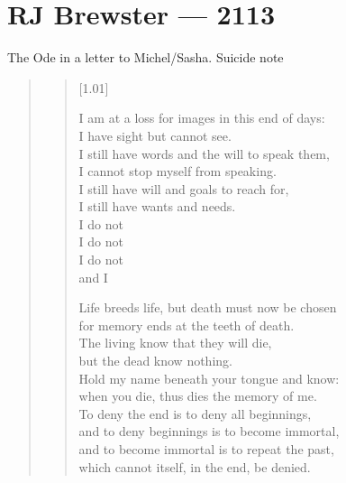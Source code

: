 \chapter*{RJ Brewster — 2113}

The Ode in a letter to Michel/Sasha. Suicide note

\begin{quote}

  \begin{verse}[1.01\textwidth]

    I am at a loss for images in this end of days:\\
    I have sight but cannot see.\\
    I still have words and the will to speak them,\\
    I cannot stop myself from speaking.\\
    I still have will and goals to reach for,\\
    I still have wants and needs.\\
    I do not\\
    I do not\\
    I do not\\
    and I

    Life breeds life, but death must now be chosen\\
    for memory ends at the teeth of death.\\
    The living know that they will die,\\
    but the dead know nothing.\\
    Hold my name beneath your tongue and know:\\
    when you die, thus dies the memory of me.\\
    To deny the end is to deny all beginnings,\\
    and to deny beginnings is to become immortal,\\
    and to become immortal is to repeat the past,\\
    which cannot itself, in the end, be denied.







\end{verse}
\end{quote}
